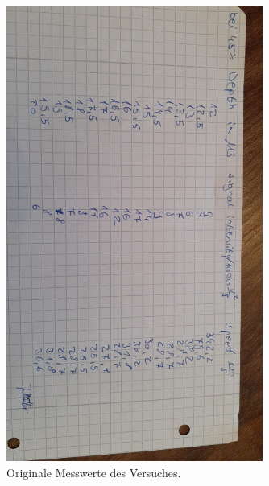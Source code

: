 \begin{figure}[H]
    \centering
    \includegraphics[angle=90, width=0.75\textwidth]{data/origDaten2.jpeg}
    \caption{Originale Messwerte des Versuches.}
    \label{fig:origDaten2}
\end{figure}